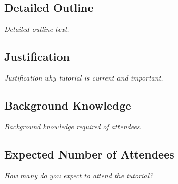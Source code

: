\documentclass[]{article}
\begin{document}
\subsection{Detailed Outline}\label{detailed-outline}

\emph{Detailed outline text.}

\subsection{Justification}\label{justification}

\emph{Justification why tutorial is current and important.}

\subsection{Background Knowledge}\label{background-knowledge}

\emph{Background knowledge required of attendees.}

\subsection{Expected Number of
Attendees}\label{expected-number-of-attendees}

\emph{How many do you expect to attend the tutorial?}
\end{document}
